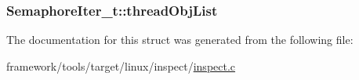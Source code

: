 \subsubsection[{\texorpdfstring{thread\+Obj\+List}{threadObjList}}]{ Semaphore\+Iter\+\_\+t\+::thread\+Obj\+List}\hypertarget{struct_semaphore_iter__t_abef86fb2e4dbf7733ef62d36abfc37de}{}\label{struct_semaphore_iter__t_abef86fb2e4dbf7733ef62d36abfc37de}


The documentation for this struct was generated from the following file\+:\begin{DoxyCompactItemize}
\item 
framework/tools/target/linux/inspect/\hyperlink{inspect_8c}{inspect.\+c}\end{DoxyCompactItemize}
